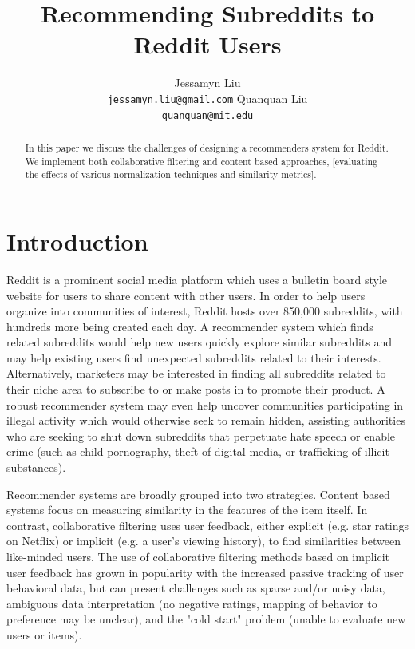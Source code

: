 \documentclass{article}
\title{Recommending Subreddits to Reddit Users}
\author{
Jessamyn Liu\\
\texttt{jessamyn.liu@gmail.com}
\And 
Quanquan Liu\\
\texttt{quanquan@mit.edu}
}
\begin{document}

\maketitle

\begin{abstract}
In this paper we discuss the challenges of designing a recommenders system for Reddit.  We implement both collaborative filtering and content based approaches, [evaluating the effects of various normalization techniques and similarity metrics].  
\end{abstract}

\section{Introduction}
\label{sec:intro}
Reddit is a prominent social media platform which uses a bulletin board style website for users to share content with other users. In order to help users organize into communities of interest, Reddit hosts over 850,000 subreddits, with hundreds more being created each day.  A recommender system which finds related subreddits would help new users quickly explore similar subreddits and may help existing users find unexpected subreddits related to their interests. Alternatively, marketers may be interested in finding all subreddits related to their niche area to subscribe to or make posts in to promote their product. A robust recommender system may even help uncover communities participating in illegal activity which would otherwise seek to remain hidden, assisting authorities who are seeking to shut down subreddits that perpetuate hate speech or enable crime (such as child pornography, theft of digital media, or trafficking of illicit substances).

Recommender systems are broadly grouped into two strategies.  Content based systems focus on measuring similarity in the features of the item itself.  In contrast, collaborative filtering uses user feedback, either explicit (e.g. star ratings on Netflix) or implicit (e.g. a user’s viewing history), to find similarities between like-minded users.  The use of collaborative filtering methods based on implicit user feedback has grown in popularity with the increased passive tracking of user behavioral data, but can present challenges such as sparse and/or noisy data, ambiguous data interpretation (no negative ratings, mapping of behavior to preference may be unclear), and the "cold start" problem (unable to evaluate new users or items).  
\end{document}
